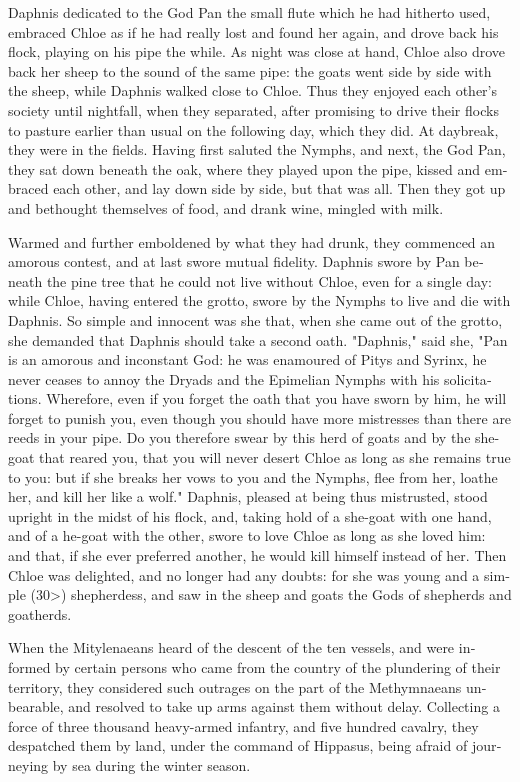\documentclass{book}
\begin{document}
\begin{pairs}
\begin{Rightside}
\begin{english}
  Daphnis dedicated to the God Pan the small flute which he had hitherto used, embraced Chloe as if he had really lost and found her again, and drove back his flock, playing on his pipe the while.  As night was close at hand, Chloe also drove back her sheep to the sound of the same pipe: the goats went side by side with the sheep, while Daphnis walked close to Chloe. Thus they enjoyed each other's society until nightfall, when they separated, after promising to drive their flocks to pasture earlier than usual on the following day, which they did. At daybreak, they were in the fields.  Having first saluted the Nymphs, and next, the God Pan, they sat down beneath the oak, where they played upon the pipe, kissed and embraced each other, and lay down side by side, but that was all.  Then they got up and bethought themselves of food, and drank wine, mingled with milk.
\pend


  Warmed and further emboldened by what they had drunk, they commenced an amorous contest, and at last swore mutual fidelity.  Daphnis swore by Pan beneath the pine tree that he could not live without Chloe, even for a single day: while Chloe, having entered the grotto, swore by the Nymphs to live and die with Daphnis. So simple and innocent was she that, when she came out of the grotto, she demanded that Daphnis should take a second oath.  "Daphnis," said she, "Pan is an amorous and inconstant God: he was enamoured of Pitys and Syrinx, he never ceases to annoy the Dryads and the Epimelian Nymphs with his solicitations.  Wherefore, even if you forget the oath that you have sworn by him, he will forget to punish you, even though you should have more mistresses than there are reeds in your pipe.  Do you therefore swear by this herd of goats and by the she-goat that reared you, that you will never desert Chloe as long as she remains true to you: but if she breaks her vows to you and the Nymphs, flee from her, loathe her, and kill her like a wolf."  Daphnis, pleased at being thus mistrusted, stood upright in the midst of his flock, and, taking hold of a she-goat with one hand, and of a he-goat with the other, swore to love Chloe as long as she loved him: and that, if she ever preferred another, he would kill himself instead of her. Then Chloe was delighted, and no longer had any doubts: for she was young and a simple (30>) shepherdess, and saw in the sheep and goats the Gods of shepherds and goatherds.
\pend


  When the Mitylenaeans heard of the descent of the ten vessels, and were informed by certain persons who came from the country of the plundering of their territory, they considered such outrages on the part of the Methymnaeans unbearable, and resolved to take up arms against them without delay.  Collecting a force of three thousand heavy-armed infantry, and five hundred cavalry, they despatched them by land, under the command of Hippasus, being afraid of journeying by sea during the winter season.
\pend



\end{english}
\end{Rightside}
\end{pairs}
\end{document}
